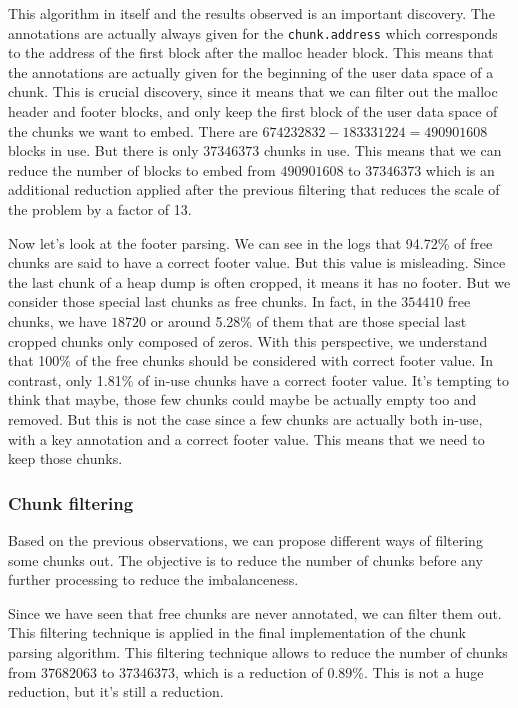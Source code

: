     This algorithm in itself and the results observed is an important discovery. The annotations are actually always given for the \texttt{chunk.address} which corresponds to the address of the first block after the malloc header block. This means that the annotations are actually given for the beginning of the user data space of a chunk. This is crucial discovery, since it means that we can filter out the malloc header and footer blocks, and only keep the first block of the user data space of the chunks we want to embed. There are $674232832 - 183331224 = 490901608$ blocks in use. But there is only $37346373$ chunks in use. This means that we can reduce the number of blocks to embed from $490901608$ to $37346373$ which is an additional reduction applied after the previous filtering that reduces the scale of the problem by a factor of 13. 
    
    Now let's look at the footer parsing. We can see in the logs that 94.72\% of free chunks are said to have a correct footer value. But this value is misleading. Since the last chunk of a heap dump is often cropped, it means it has no footer. But we consider those special last chunks as free chunks. In fact, in the $354410$ free chunks, we have $18720$ or around 5.28\% of them that are those special last cropped chunks only composed of zeros. With this perspective, we understand that 100\% of the free chunks should be considered with correct footer value. In contrast, only 1.81\% of in-use chunks have a correct footer value. It's tempting to think that maybe, those few chunks could maybe be actually empty too and removed. But this is not the case since a few chunks are actually both in-use, with a key annotation and a correct footer value. This means that we need to keep those chunks.

    \subsubsection{Chunk filtering}
    Based on the previous observations, we can propose different ways of filtering some chunks out. The objective is to reduce the number of chunks before any further processing to reduce the imbalanceness.

    Since we have seen that free chunks are never annotated, we can filter them out. This filtering technique is applied in the final implementation of the chunk parsing algorithm. This filtering technique allows to reduce the number of chunks from $37682063$ to $37346373$, which is a reduction of 0.89\%. This is not a huge reduction, but it's still a reduction.

